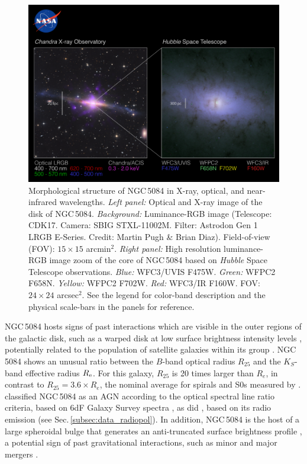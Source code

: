 \documentclass[modern]{CORE-AAS/aastex631}
\begin{document}
{\begin{figure}[t!]
\begin{center}
\includegraphics[trim={0 10 0 100}, clip, width=\textwidth]{FIGURES/Composition_NGC5084_poster_v6_paper.png}
\caption{Morphological structure of NGC\,5084 in X-ray, optical, and near-infrared wavelengths. \emph{Left panel:} Optical and X-ray image of 
the disk of NGC\,5084. \emph{Background:} Luminance-RGB image (Telescope: CDK17. Camera: SBIG STXL-11002M. Filter: Astrodon Gen 1 LRGB E-Series. Credit: Martin Pugh \& Brian Diaz). Field-of-view (FOV): $15\times15$ arcmin$^{2}$. \emph{Right panel:} High resolution luminance-RGB image zoom of the core of NGC\,5084 based on \emph{Hubble} Space Telescope observations. \emph{Blue:} WFC3/UVIS F475W. \emph{Green:} WFPC2 F658N. \emph{Yellow:} WFPC2 F702W. \emph{Red:} WFC3/IR F160W.  FOV: $24\times24$ arcsec$^{2}$. See the legend for color-band description and the physical scale-bars in the panels for reference.} 
\label{fig:NGC5084_poster}
\end{center}
\end{figure}


NGC\,5084 hosts signs of past interactions which are visible in the outer regions of the galactic disk, such as a warped disk at low surface brightness intensity levels \citep{zeilinger+1990mnras246_324}, potentially related to the population of satellite galaxies within its group \citep{carignan+1997aj113_1585}. NGC\,5084 shows an unusual ratio between the $B$-band optical radius $R_{25}$ and the $K_S$-band
effective radius $R_{\rm e}$. For this galaxy, $R_{25}$ is 20 times larger than $R_e$, in contrast to $R_{25}=3.6 \times R_e$, the nominal average for spirals and S0s measured by  \citet[][]{williams+2009mnras400_1665}.  \citet{zaw+2019apj872_134} classified NGC\,5084 as an AGN according to the \citet{kewley+2001apj556_121} optical spectral line ratio criteria, based on 6dF Galaxy Survey spectra \citep{jones+2004mnras355_747,jones+2009mnras399_683}, as did \citet{irwin+2019aj158_21}, based on its radio emission (see Sec.\,\ref{subsec:data_radiopol}). In addition, NGC\,5084 is the host of a large spheroidal bulge that generates an anti-truncated surface brightness profile \citep{comeron+2012apj759_98}, a potential sign of past gravitational interactions, such as minor and major mergers \citep{younger+2007apj670_269, borlaff+2014aap570_103}.

}
\end{document}
